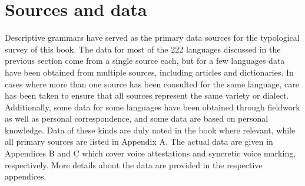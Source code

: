 \section{Sources and data} \label{sources}
Descriptive grammars have served as the primary data sources for the typological survey of this book. The data for most of the 222 languages discussed in the previous section come from a single source each, but for a few languages data have been obtained from multiple sources, including articles and dictionaries. In cases where more than one source has been consulted for the same language, care has been taken to ensure that all sources represent the same variety or dialect. Additionally, some data for some languages have been obtained through fieldwork as well as personal correspondence, and some data are based on personal knowledge. Data of these kinds are duly noted in the book where relevant, while all primary sources are listed in Appendix A. The actual data are given in Appendices B and C which cover voice attestations and syncretic voice marking, respectively. More details about the data are provided in the respective appendices.